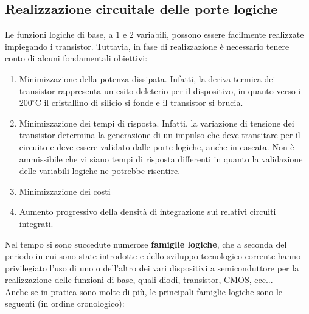 \documentclass[a4paper]{extarticle}
\begin{document}
\subsection{Realizzazione circuitale delle porte logiche}
Le funzioni logiche di base, a \(1\) e \(2\) variabili, possono essere facilmente realizzate impiegando i transistor. Tuttavia, in fase di realizzazione è necessario tenere conto di alcuni fondamentali obiettivi:
\begin{enumerate}
    \item Minimizzazione della potenza dissipata. Infatti, la deriva termica dei transistor rappresenta un esito deleterio per il dispositivo, in quanto verso i \(200 ^{\circ}\)C il cristallino di silicio si fonde e il transistor si brucia.

    \item Minimizzazione dei tempi di risposta. Infatti, la variazione di tensione dei transistor determina la generazione di un impulso che deve transitare per il circuito e deve essere validato dalle porte logiche, anche in cascata. Non è ammissibile che vi siano tempi di risposta differenti in quanto la validazione delle variabili logiche ne potrebbe risentire.

    \item Minimizzazione dei costi

    \item Aumento progressivo della densità di integrazione sui relativi circuiti integrati.
\end{enumerate}

\noindent
Nel tempo si sono succedute numerose \textbf{famiglie logiche}, che a seconda del periodo in cui sono state introdotte e dello sviluppo tecnologico corrente hanno privilegiato l’uso di uno o dell’altro dei vari dispositivi a semiconduttore per la realizzazione delle funzioni di base, quali diodi, transistor, CMOS, ecc...\\
Anche se in pratica sono molte di più, le principali famiglie logiche sono le seguenti (in ordine cronologico):
\end{document}
